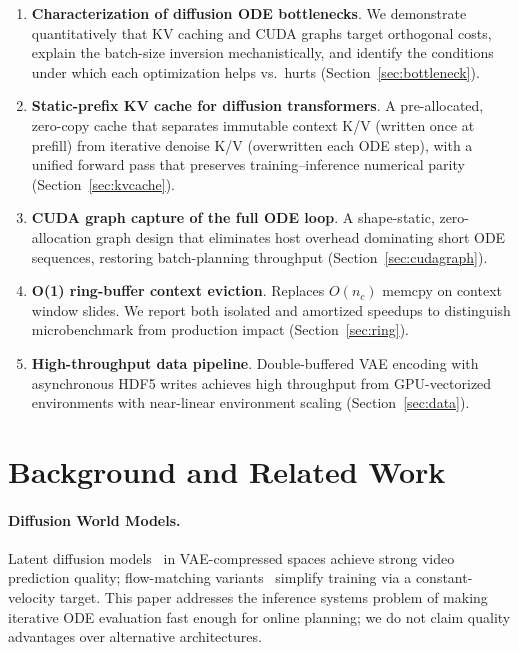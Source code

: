 \documentclass[letterpaper,twocolumn,10pt]{article}
\begin{document}
\begin{enumerate}
  \item \textbf{Characterization of diffusion ODE bottlenecks}.
        We demonstrate quantitatively that KV caching and CUDA graphs
        target orthogonal costs, explain the batch-size inversion
        mechanistically, and identify the conditions under which each
        optimization helps vs.\ hurts
        (Section~\ref{sec:bottleneck}).

  \item \textbf{Static-prefix KV cache for diffusion transformers}.
        A pre-allocated, zero-copy cache that separates immutable
        context K/V (written once at prefill) from iterative denoise
        K/V (overwritten each ODE step), with a unified forward pass
        that preserves training--inference numerical parity
        (Section~\ref{sec:kvcache}).

  \item \textbf{CUDA graph capture of the full ODE loop}.
        A shape-static, zero-allocation graph design that eliminates
        host overhead dominating short ODE sequences, restoring batch-planning
        throughput (Section~\ref{sec:cudagraph}).

  \item \textbf{O(1) ring-buffer context eviction}.
        Replaces $O(n_c)$ memcpy on context window slides.  We report
        both isolated and amortized speedups to distinguish microbenchmark from
        production impact (Section~\ref{sec:ring}).

  \item \textbf{High-throughput data pipeline}.
        Double-buffered VAE encoding with asynchronous HDF5 writes
        achieves high throughput from GPU-vectorized environments with
        near-linear environment scaling (Section~\ref{sec:data}).
\end{enumerate}

\section{Background and Related Work}

\paragraph{Diffusion World Models.}
Latent diffusion models~\cite{ho2020ddpm} in VAE-compressed spaces
achieve strong video prediction quality; flow-matching
variants~\cite{lipman2023flow} simplify training via a
constant-velocity target.  This paper addresses the inference systems
problem of making iterative ODE evaluation fast enough for
online planning; we do not claim quality advantages over alternative
architectures.
\end{document}
